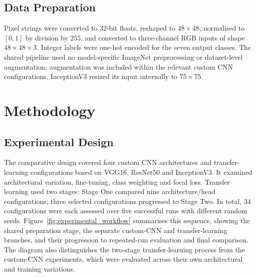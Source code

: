\documentclass[10pt, a4paper]{article}
\let\oldsection\section
\renewcommand{\section}{%
    \Needspace{4\baselineskip}%
    \oldsection
}
\let\oldsubsection\subsection
\renewcommand{\subsection}{%
    \Needspace{4\baselineskip}%
    \oldsubsection
}
\begin{document}
		\subsection{Data Preparation}
			
			Pixel strings were converted to 32-bit floats, reshaped to $48\times48$, normalised to $[0,1]$ by division by $255$, and converted to three-channel RGB inputs of shape $48\times48\times3$. Integer labels were one-hot encoded for the seven output classes. The shared pipeline used no model-specific ImageNet preprocessing or dataset-level augmentation; augmentation was included within the relevant custom CNN configurations. InceptionV3 resized its input internally to $75\times75$.
				
	
	\section{Methodology}
	
		\subsection{Experimental Design}
		
			The comparative design covered four custom CNN architectures and transfer-learning configurations based on VGG16, ResNet50 and InceptionV3. It examined architectural variation, fine-tuning, class weighting and focal loss. Transfer learning used two stages: Stage One compared nine architecture/head configurations; three selected configurations progressed to Stage Two. In total, $34$ configurations were each assessed over five successful runs with different random seeds. Figure~\ref{fig:experimental_workflow} summarises this sequence, showing the shared preparation stage, the separate custom-CNN and transfer-learning branches, and their progression to repeated-run evaluation and final comparison. The diagram also distinguishes the two-stage transfer-learning process from the custom-CNN experiments, which were evaluated across their own architectural and training variations.
		
\end{document}
